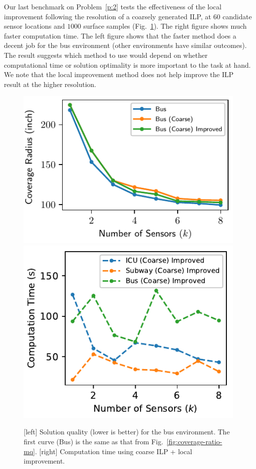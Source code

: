 Our last benchmark on Problem~\ref{p:2} tests the effectiveness of the local improvement following the resolution of a coarsely generated ILP, at $60$ candidate sensor locations and $1000$ surface samples (Fig.~\ref{fig:coverage-ratio-cu}). The right figure shows much faster computation time. The left figure shows that the  faster method does a decent job for the bus environment (other environments have similar outcomes). The result suggests which method to use would depend on whether computational time or solution optimality is more important to the task at hand. We note that the local improvement method does not help improve the ILP result at the higher resolution. 

\begin{figure}[!ht]
    \centering
    \includegraphics[width=.48\columnwidth, height=1.in]{chapters/surf/fig/result-bus-mq-eps-converted-to.pdf}
    \includegraphics[width=.48\columnwidth, height=1.in]{chapters/surf/fig/result-time-mq-coarse-eps-converted-to.pdf}    
    \caption{ [left] Solution quality (lower is better) for the bus environment. 
    The first curve (Bus) is the same as that from Fig.~\ref{fig:coverage-ratio-mq}. 
    [right] Computation time using coarse ILP + local improvement.}
\label{fig:coverage-ratio-cu}
\end{figure}

